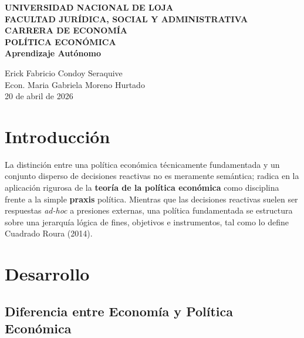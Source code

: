 \documentclass[12pt,spanish]{article}
\begin{document}
\begin{center}
    {\bfseries \Large UNIVERSIDAD NACIONAL DE LOJA}\\[0.3cm]
    {\bfseries \large FACULTAD JURÍDICA, SOCIAL Y
ADMINISTRATIVA}\\[0.2cm]
    {\bfseries CARRERA DE ECONOMÍA}\\[1.5cm]
    
    {\bfseries \large POLÍTICA ECONÓMICA}\\[1cm]
    
    {\bfseries \Large Aprendizaje Autónomo}\\[1.5cm]
\end{center}

 Erick Fabricio Condoy Seraquive \\
 Econ. Maria Gabriela Moreno Hurtado \\
 20 de abril de 2026 \\

\vspace{1cm}

\doublespacing
\setlength{\parindent}{1.27cm}

\section{Introducción}\label{introducciuxf3n}

La distinción entre una política económica técnicamente fundamentada y
un conjunto disperso de decisiones reactivas no es meramente semántica;
radica en la aplicación rigurosa de la \textbf{teoría de la política
económica} como disciplina frente a la simple \textbf{praxis} política.
Mientras que las decisiones reactivas suelen ser respuestas
\emph{ad-hoc} a presiones externas, una política fundamentada se
estructura sobre una jerarquía lógica de fines, objetivos e
instrumentos, tal como lo define Cuadrado Roura (2014).

\section{Desarrollo}\label{desarrollo}

\subsection{Diferencia entre Economía y Política
Económica}\label{diferencia-entre-economuxeda-y-poluxedtica-econuxf3mica}
\end{document}
